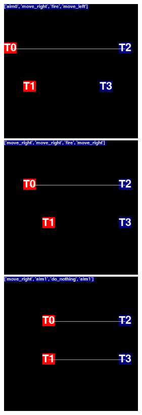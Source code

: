\begin{figure}
\centering
\begin{minipage}{.5\textwidth}
  \centering
  \includegraphics[width=7cm]{images/animation01/screenshot0-1.png}
\end{minipage}%
\begin{minipage}{.5\textwidth}
  \centering
  \includegraphics[width=7cm]{images/animation01/screenshot0-2.png}
\end{minipage}
\centering
\begin{minipage}{.5\textwidth}
  \centering
  \includegraphics[width=7cm]{images/animation01/screenshot0-3.png}

\end{minipage}
\end{figure}
